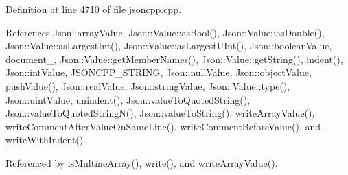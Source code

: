 Definition at line 4710 of file jsoncpp.\+cpp.



References Json\+::array\+Value, Json\+::\+Value\+::as\+Bool(), Json\+::\+Value\+::as\+Double(), Json\+::\+Value\+::as\+Largest\+Int(), Json\+::\+Value\+::as\+Largest\+U\+Int(), Json\+::boolean\+Value, document\+\_\+, Json\+::\+Value\+::get\+Member\+Names(), Json\+::\+Value\+::get\+String(), indent(), Json\+::int\+Value, J\+S\+O\+N\+C\+P\+P\+\_\+\+S\+T\+R\+I\+NG, Json\+::null\+Value, Json\+::object\+Value, push\+Value(), Json\+::real\+Value, Json\+::string\+Value, Json\+::\+Value\+::type(), Json\+::uint\+Value, unindent(), Json\+::value\+To\+Quoted\+String(), Json\+::value\+To\+Quoted\+String\+N(), Json\+::value\+To\+String(), write\+Array\+Value(), write\+Comment\+After\+Value\+On\+Same\+Line(), write\+Comment\+Before\+Value(), and write\+With\+Indent().



Referenced by is\+Multine\+Array(), write(), and write\+Array\+Value().


